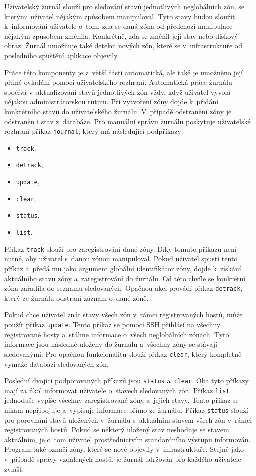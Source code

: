 Uživatelský žurnál slouží pro sledování stavů jednotlivých neglobálních zón, se kterými uživatel nějakým způsobem manipuloval.
Tyto stavy budou sloužit k~informování uživatele o~tom, zda se daná zóna od předchozí manipulace nějakým způsobem změnila.
Konkrétně, zda se změnil její stav nebo diskový obraz. Žurnál umožňuje také detekci nových zón, které se v~infrastruktuře
od posledního spuštění aplikace objevily.

Práce této komponenty je z~větší části automatická, ale také je umožněno její přímé ovládání pomocí uživatelského rozhraní. Automatická
práce žurnálu spočívá v~aktualizování stavů jednotlivých zón vždy, když uživatel vyvolá nějakou administrátorskou rutinu. Při vytvoření
zóny dojde k~přidání konkrétního stavu do uživatelského žurnálu. V~případě odstranění zóny je odstraněn i stav z~databáze. Pro 
manuální správu žurnálu poskytuje uživatelské rozhraní příkaz \verb|journal|, který má následující podpříkazy:
\begin{itemize}
 \item \verb|track|,
 \item \verb|detrack|,
 \item \verb|update|,
 \item \verb|clear|,
 \item \verb|status|,
 \item \verb|list|.
\end{itemize}
Příkaz \verb|track| slouží pro zaregistrování dané zóny. Díky tomuto příkazu není nutné, aby uživatel s~danou zónou manipuloval.
Pokud uživatel spustí tento příkaz a~předá mu jako argument globální identifikátor zóny, dojde k~získání aktuálního stavu zóny
a~zaregistrování do žurnálu. Od této chvíle se konkrétní zóna zařadila do seznamu sledovaných. Opačnou akci provádí příkaz
\verb|detrack|, který ze žurnálu odstraní záznam o~dané zóně.

Pokud chce uživatel znát stavy všech zón v~rámci registrovaných hostů, může použít příkaz \verb|update|. Tento příkaz se pomocí
SSH přihlásí na všechny registrované hosty a~stáhne informace o~všech neglobálních zónách. Tyto informace jsou následně uloženy
do žurnálu a~všechny zóny se stávají sledovanými. Pro opačnou funkcionalitu slouží příkaz \verb|clear|, který kompletně vymaže
databázi sledovaných zón.

Poslední dvojicí podporovaných příkazů jsou \verb|status| a~\verb|clear|. Oba tyto příkazy mají za úkol informovat uživatele
o~stavech sledovaných zón. Příkaz \verb|list| jednoduše vypíše všechny zaregistrované zóny a~jejich stavy. Tento příkaz se nikam
nepřipojuje a~vypisuje informace přímo ze žurnálu. Příkaz \verb|status| slouží pro porovnání stavů uložených v~žurnálu
s~aktuálním stavem všech zón v~rámci registrovaných hostů. Pokud se některý uložený stav neshoduje se stavem aktuálním, je 
o~tom uživatel prostřednictvím standardního výstupu informován. Program také označí zóny, které se nově objevily v~infrastruktuře. 
Stejně jako v~případě správy vzdálených hostů, je žurnál udržován pro každého uživatele zvlášť. 
